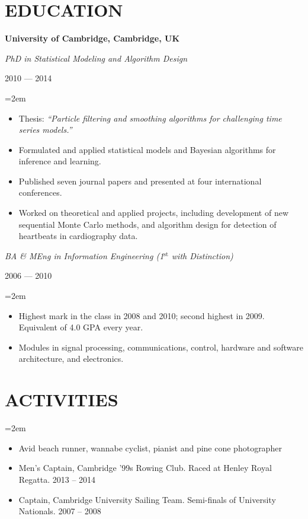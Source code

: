 \documentclass[letterpaper,10pt]{article}
\newcommand{\sepspace}{\vspace*{0.3em}}
\newcommand{\NewPart}[1]{\vspace{-1em} \section*{\uppercase{#1}}}
\newcommand{\MainHeading}[1]{\noindent\textbf{#1}}
\newcommand{\SubHeading}[1]{\noindent\textit{#1}}
\newcommand{\DateBox}[1]{\colorbox{light-gray}{\parbox{8em}{\hfill\color{White}#1}}}
\newcommand{\Details}[1]{\hangindent=2em\hangafter=0\small#1\normalsize\par}
\newcommand{\EducationEntry}[3]{%
                \SubHeading{#1} \hfill \DateBox{#2} \par
                \Details{#3} }
\begin{document}
\NewPart{Education}

\MainHeading{University of Cambridge, Cambridge, UK}

\EducationEntry{PhD in Statistical Modeling and Algorithm Design}{2010 --- 2014}{
\begin{itemize}
 \item Thesis: \textit{``Particle filtering and smoothing algorithms for challenging time series models.''}
 \item Formulated and applied statistical models and Bayesian algorithms for inference and learning.
 \item Published seven journal papers and presented at four international conferences.
 \item Worked on theoretical and applied projects, including development of new sequential Monte Carlo methods, and algorithm design for detection of heartbeats in cardiography data.
\end{itemize}
}
\sepspace

\EducationEntry{BA \& MEng in Information Engineering (1$^{\text{st}}$ with Distinction)}{2006 --- 2010}{
\begin{itemize}
  \item Highest mark in the class in 2008 and 2010; second highest in 2009. Equivalent of 4.0 GPA every year.
  \item Modules in signal processing, communications, control, hardware and software architecture, and electronics.
\end{itemize}
}



\NewPart{Activities}

\Details{
\begin{itemize}
 \item Avid beach runner, wannabe cyclist, pianist and  pine cone photographer
 \item Men's Captain, Cambridge '99s Rowing Club. Raced at Henley Royal Regatta. 2013 -- 2014
 \item Captain, Cambridge University Sailing Team. Semi-finals of University Nationals. 2007 -- 2008
\end{itemize}
}
\end{document}
